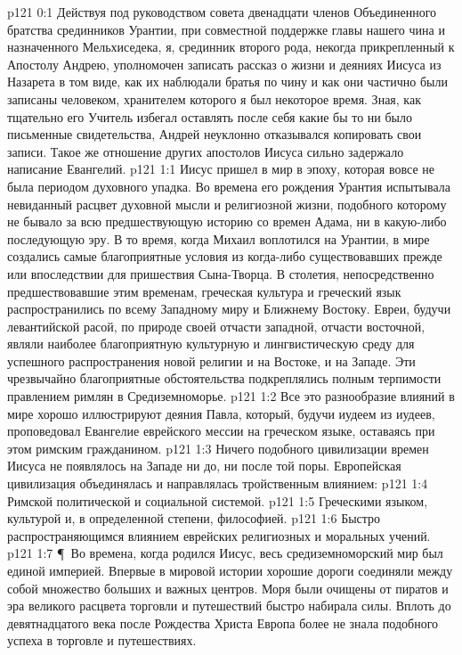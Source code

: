\vs p121 0:1 Действуя под руководством совета двенадцати членов Объединенного братства срединников Урантии, при совместной поддержке главы нашего чина и назначенного Мельхиседека, я, срединник второго рода, некогда прикрепленный к Апостолу Андрею, уполномочен записать рассказ о жизни и деяниях Иисуса из Назарета в том виде, как их наблюдали братья по чину и как они частично были записаны человеком, хранителем которого я был некоторое время. Зная, как тщательно его Учитель избегал оставлять после себя какие бы то ни было письменные свидетельства, Андрей неуклонно отказывался копировать свои записи. Такое же отношение других апостолов Иисуса сильно задержало написание Евангелий.
\vs p121 1:1 Иисус пришел в мир в эпоху, которая вовсе не была периодом духовного упадка. Во времена его рождения Урантия испытывала невиданный расцвет духовной мысли и религиозной жизни, подобного которому не бывало за всю предшествующую историю со времен Адама, ни в какую\hyp{}либо последующую эру. В то время, когда Михаил воплотился на Урантии, в мире создались самые благоприятные условия из когда\hyp{}либо существовавших прежде или впоследствии для пришествия Сына\hyp{}Творца. В столетия, непосредственно предшествовавшие этим временам, греческая культура и греческий язык распространились по всему Западному миру и Ближнему Востоку. Евреи, будучи левантийской расой, по природе своей отчасти западной, отчасти восточной, являли наиболее благоприятную культурную и лингвистическую среду для успешного распространения новой религии и на Востоке, и на Западе. Эти чрезвычайно благоприятные обстоятельства подкреплялись полным терпимости правлением римлян в Средиземноморье.
\vs p121 1:2 Все это разнообразие влияний в мире хорошо иллюстрируют деяния Павла, который, будучи иудеем из иудеев, проповедовал Евангелие еврейского мессии на греческом языке, оставаясь при этом римским гражданином.
\vs p121 1:3 Ничего подобного цивилизации времен Иисуса не появлялось на Западе ни до, ни после той поры. Европейская цивилизация объединялась и направлялась тройственным влиянием:
\vs p121 1:4 \bibnobreakspace Римской политической и социальной системой.
\vs p121 1:5 \bibnobreakspace Греческими языком, культурой и, в определенной степени, философией.
\vs p121 1:6 \bibnobreakspace Быстро распространяющимся влиянием еврейских религиозных и моральных учений.
\vs p121 1:7 \P\ Во времена, когда родился Иисус, весь средиземноморский мир был единой империей. Впервые в мировой истории хорошие дороги соединяли между собой множество больших и важных центров. Моря были очищены от пиратов и эра великого расцвета торговли и путешествий быстро набирала силы. Вплоть до девятнадцатого века после Рождества Христа Европа более не знала подобного успеха в торговле и путешествиях.
